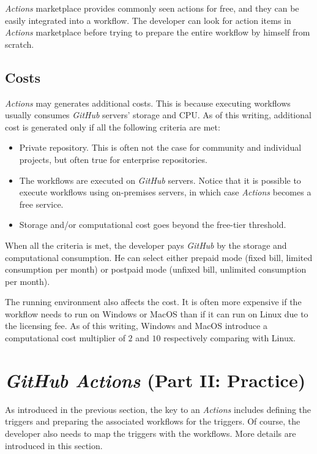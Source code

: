 \textit{Actions} marketplace provides commonly seen actions for free, and they can be easily integrated into a workflow. The developer can look for action items in \textit{Actions} marketplace before trying to prepare the entire workflow by himself from scratch.

\subsection{Costs}

\textit{Actions} may generates additional costs. This is because executing workflows usually consumes \textit{GitHub} servers' storage and CPU. As of this writing, additional cost is generated only if all the following criteria are met:
\begin{itemize}
	\item Private repository. This is often not the case for community and individual projects, but often true for enterprise repositories.
	\item The workflows are executed on \textit{GitHub} servers. Notice that it is possible to execute workflows using on-premises servers, in which case \textit{Actions} becomes a free service.
	\item Storage and/or computational cost goes beyond the free-tier threshold.
\end{itemize}

When all the criteria is met, the developer pays \textit{GitHub} by the storage and computational consumption. He can select either prepaid mode (fixed bill, limited consumption per month) or postpaid mode (unfixed bill, unlimited consumption per month).

The running environment also affects the cost. It is often more expensive if the workflow needs to run on Windows or MacOS than if it can run on Linux due to the licensing fee. As of this writing, Windows and MacOS introduce a computational cost multiplier of $2$ and $10$ respectively comparing with Linux.

\section{\textit{GitHub Actions} (Part II: Practice)}

As introduced in the previous section, the key to an \textit{Actions} includes defining the triggers and preparing the associated workflows for the triggers. Of course, the developer also needs to map the triggers with the workflows. More details are introduced in this section.

